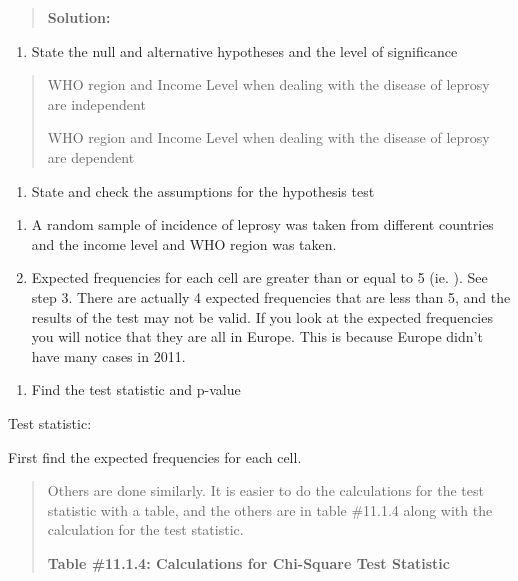 \documentclass[]{book}
\providecommand{\tightlist}{%
  \setlength{\itemsep}{0pt}\setlength{\parskip}{0pt}}
\begin{document}
\begin{quote}
\textbf{Solution:}
\end{quote}

\begin{enumerate}
\def\labelenumi{\arabic{enumi}.}
\tightlist
\item
  State the null and alternative hypotheses and the level of
  significance
\end{enumerate}

\begin{quote}
WHO region and Income Level when dealing with the disease of leprosy are independent

WHO region and Income Level when dealing with the disease of leprosy are dependent
\end{quote}

\begin{enumerate}
\def\labelenumi{\arabic{enumi}.}
\setcounter{enumi}{1}
\tightlist
\item
  State and check the assumptions for the hypothesis test
\end{enumerate}

\begin{enumerate}
\def\labelenumi{\alph{enumi}.}
\item
  A random sample of incidence of leprosy was taken from different countries and the income level and WHO region was taken.
\item
  Expected frequencies for each cell are greater than or equal to 5 (ie. ). See step 3. There are actually 4 expected frequencies that are less than 5, and the results of the test may not be valid. If you look at the expected frequencies you will notice that they are all in Europe. This is because Europe didn't have many cases in 2011.
\end{enumerate}

\begin{enumerate}
\def\labelenumi{\arabic{enumi}.}
\setcounter{enumi}{2}
\tightlist
\item
  Find the test statistic and p-value
\end{enumerate}

Test statistic:

First find the expected frequencies for each cell.

\begin{quote}
Others are done similarly. It is easier to do the calculations for the test statistic with a table, and the others are in table \#11.1.4 along with the calculation for the test statistic.

\textbf{Table \#11.1.4: Calculations for Chi-Square Test Statistic}
\end{quote}
\end{document}
